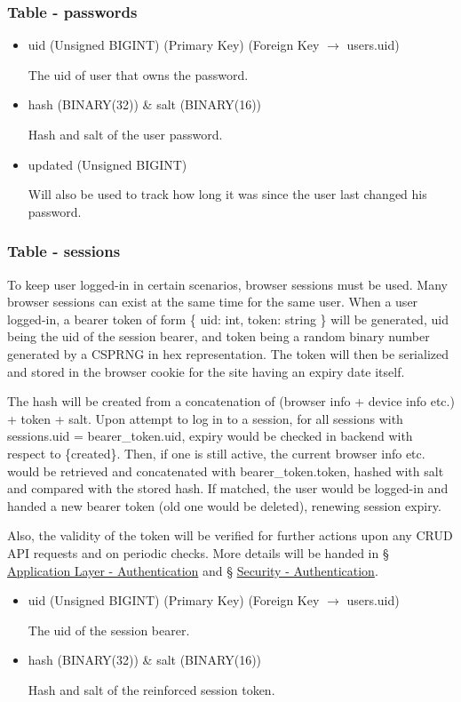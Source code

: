 \documentclass[12pt]{report}
\newcommand{\n}{\par}
\begin{document}
\subsubsection{Table - passwords} \label{data-layer.design.user-system.passwords}
\begin{itemize}
	\item uid (Unsigned BIGINT) (Primary Key) (Foreign Key $\rightarrow$ users.uid)\n
	      The uid of user that owns the password.
	\item hash (BINARY(32)) \& salt (BINARY(16))\n
	      Hash and salt of the user password.
	\item updated (Unsigned BIGINT)\n
	      Will also be used to track how long it was since the user last changed his password.
\end{itemize}

\subsubsection{Table - sessions} \label{data-layer.design.user-system.sessions}
To keep user logged-in in certain scenarios, browser sessions must be used.
Many browser sessions can exist at the same time for the same user.
When a user logged-in, a bearer token of form
\{ uid: int, token: string \}
will be generated,
uid being the uid of the session bearer, and
token being a random binary number generated by a CSPRNG in hex representation.
The token will then be serialized and stored in the browser cookie for the site having an expiry date itself.\n
The hash will be created from a concatenation of (browser info + device info etc.) + token + salt.
Upon attempt to log in to a session,
for all sessions with sessions.uid = bearer\_token.uid,
expiry would be checked in backend with respect to \{created\}.
Then, if one is still active, the current browser info etc. would be retrieved and concatenated with bearer\_token.token,
hashed with salt and compared with the stored hash.
If matched, the user would be logged-in and handed a new bearer token (old one would be deleted), renewing session expiry.\n
Also, the validity of the token will be verified for further actions upon any CRUD API requests and on periodic checks.
More details will be handed in \S{} \hyperref[application-layer.implementation.authentication]{Application Layer - Authentication} and
\S{} \hyperref[security.authentication]{Security - Authentication}.
\begin{itemize}
	\item uid (Unsigned BIGINT) (Primary Key) (Foreign Key $\rightarrow$ users.uid)\n
	      The uid of the session bearer.
	\item hash (BINARY(32)) \& salt (BINARY(16))\n
	      Hash and salt of the reinforced session token.
\end{itemize}
\end{document}
